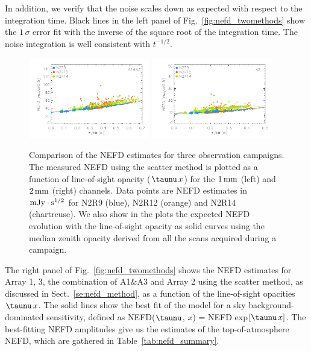 In addition, we verify that the noise scales down as expected with
respect to the integration time. Black lines in the left panel of
Fig.~\ref{fig:nefd_twomethods} show the $1\, \sigma$ error fit with the
inverse of the square root of the integration time. The noise
integration is well consistent with $t^{-1/2}$.

\begin{figure}[!thbp]
\begin{center}
\includegraphics[clip=true,width=0.47\textwidth]{Figures/plot_nefd_vs_obstau_corrected_skydip_vfinal_1mm.pdf}
\includegraphics[clip=true,width=0.47\textwidth]{Figures/plot_nefd_vs_obstau_corrected_skydip_vfinal_a2.pdf}
\caption{Comparison of the NEFD estimates for three observation
  campaigns. The measured NEFD using the scatter method is plotted as a function of
  line-of-sight opacity ($\taunu\,x$) for the $1\,\rm{mm}$ (left) and $2\,\rm{mm}$ (right)
  channels. Data points are NEFD estimates in $\rm{mJy}\cdot s^{1/2}$ for N2R9 (blue), N2R12 (orange)
  and N2R14 (chartreuse). We also show in the plots the expected NEFD evolution
  with the line-of-sight opacity as solid curves using the median
  zenith opacity derived from all the scans acquired during a campaign.}
\label{fig:nefdvsbackground_below_1Jy}
\end{center}
\end{figure}

The right panel of Fig.~\ref{fig:nefd_twomethods} shows the NEFD
estimates for  Array 1, 3, the combination of A1$\&$A3 and Array 2
using the scatter method, as discussed in Sect.~\ref{se:nefd_method},
as a function of the line-of-sight opacities $\taunu\,x $.
The solid lines show the best fit of the model for a sky
background-dominated sensitivity,
defined as NEFD($\taunu$, $x$) = NEFD exp${[\taunu\, x]}$. The
best-fitting NEFD amplitudes give us the estimates of the
top-of-atmosphere NEFD, which are gathered in
Table~\ref{tab:nefd_summary}.

